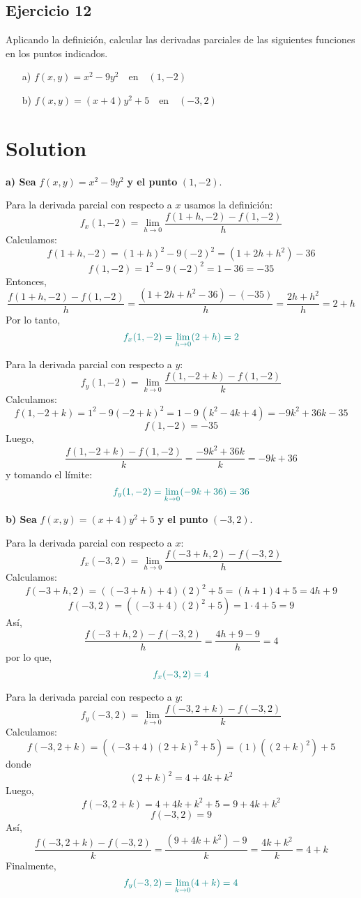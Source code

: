 \documentclass{article}
\begin{document}
\newpage


\subsection{Ejercicio 12}

Aplicando la definición, calcular las derivadas parciales de las siguientes funciones en los puntos indicados.

\begin{itemize}
  \item[a)] \( f(x, y) = x^2 - 9y^2 \quad \text{en} \quad (1, -2) \)
  \item[b)] \( f(x, y) = (x + 4)y^2 + 5 \quad \text{en} \quad (-3, 2) \)
\end{itemize}

\newpage
\section*{Solution}

\textbf{a) Sea } \( f(x,y)=x^2-9y^2 \) \textbf{ y el punto } \((1,-2)\).

Para la derivada parcial con respecto a \(x\) usamos la definición:
\[
f_x(1,-2)=\lim_{h\to0}\frac{f(1+h,-2)-f(1,-2)}{h}
\]
Calculamos:
\[
f(1+h,-2)=(1+h)^2-9(-2)^2=(1+2h+h^2)-36
\]
\[
f(1,-2)=1^2-9(-2)^2=1-36=-35
\]
Entonces,
\[
\frac{f(1+h,-2)-f(1,-2)}{h}=\frac{(1+2h+h^2-36)-(-35)}{h}=\frac{2h+h^2}{h}=2+h
\]
Por lo tanto,
\[\color{teal}
f_x(1,-2)=\lim_{h\to0}(2+h)=2
\]

Para la derivada parcial con respecto a \(y\):
\[
f_y(1,-2)=\lim_{k\to0}\frac{f(1,-2+k)-f(1,-2)}{k}
\]
Calculamos:
\[
f(1,-2+k)=1^2-9(-2+k)^2=1-9\,(k^2-4k+4)=-9k^2+36k-35
\]
\[
f(1,-2)=-35
\]
Luego,
\[
\frac{f(1,-2+k)-f(1,-2)}{k}=\frac{-9k^2+36k}{k}=-9k+36
\]
y tomando el límite:
\[\color{teal}
f_y(1,-2)=\lim_{k\to0}(-9k+36)=36
\]

\bigskip

\textbf{b) Sea } \( f(x,y)=(x+4)y^2+5 \) \textbf{ y el punto } \((-3,2)\).

Para la derivada parcial con respecto a \(x\):
\[
f_x(-3,2)=\lim_{h\to0}\frac{f(-3+h,2)-f(-3,2)}{h}
\]
Calculamos:
\[
f(-3+h,2)=((-3+h)+4)(2)^2+5=(h+1)4+5=4h+9
\]
\[
f(-3,2)=((-3+4)(2)^2+5)=1\cdot4+5=9
\]
Así,
\[
\frac{f(-3+h,2)-f(-3,2)}{h}=\frac{4h+9-9}{h}=4
\]
por lo que,
\[\color{teal}
f_x(-3,2)=4
\]

Para la derivada parcial con respecto a \(y\):
\[
f_y(-3,2)=\lim_{k\to0}\frac{f(-3,2+k)-f(-3,2)}{k}
\]
Calculamos:
\[
f(-3,2+k)=((-3+4)(2+k)^2+5)=(1)( (2+k)^2 )+5
\]
donde
\[
(2+k)^2=4+4k+k^2
\]
Luego,
\[
f(-3,2+k)=4+4k+k^2+5=9+4k+k^2
\]
\[
f(-3,2)=9
\]
Así,
\[
\frac{f(-3,2+k)-f(-3,2)}{k}=\frac{(9+4k+k^2)-9}{k}=\frac{4k+k^2}{k}=4+k
\]
Finalmente,
\[ \color{teal}
f_y(-3,2)=\lim_{k\to0}(4+k)=4
\]
\end{document}
